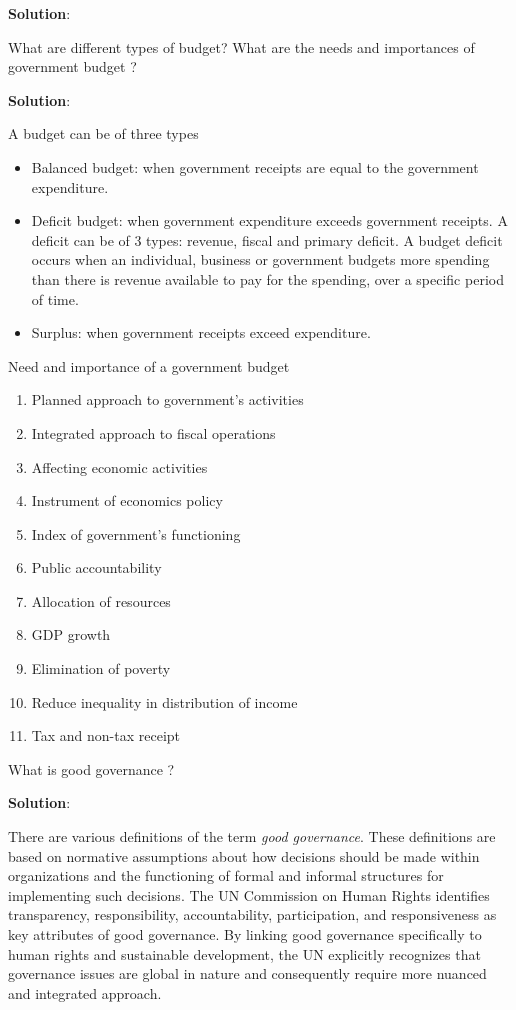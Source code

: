 \documentclass[
]{book}
\newcommand{\question}{\item}
\newenvironment{solution}{ {\bfseries Solution}:}{}
\begin{document}
\begin{questions}
\begin{solution}
\end{solution}

\question What are different types of budget? What are the needs and importances of government budget ?

\begin{solution}

A budget can be of three types
\begin{itemize}
\item Balanced budget: when government receipts are equal to the government expenditure.
\item Deficit budget: when government expenditure exceeds government receipts. A deficit can be of 3 types: revenue, fiscal and primary deficit. A budget deficit occurs when an individual, business or government budgets more spending than there is revenue available to pay for the spending, over a specific period of time.
\item Surplus: when government receipts exceed expenditure.
\end{itemize}

Need and importance of a government budget
\begin{enumerate}
\item Planned approach to government's activities
\item Integrated approach to fiscal operations
\item Affecting economic activities
\item Instrument of economics policy
\item Index of government's functioning
\item Public accountability
\item Allocation of resources
\item GDP growth
\item Elimination of poverty
\item Reduce inequality in distribution of income
\item Tax and non-tax receipt
\end{enumerate}

\end{solution}

\question What is good governance ?

\begin{solution}

There are various definitions of the term \textit{good governance}. These definitions are based on normative assumptions about how decisions should be made within organizations and the functioning of formal and informal structures for implementing such decisions. The UN Commission on Human Rights identifies transparency, responsibility, accountability, participation, and responsiveness as key attributes of good governance. By linking good governance specifically to human rights and sustainable development, the UN explicitly recognizes that governance issues are global in nature and consequently require more nuanced and integrated approach. 


\end{solution}
\end{questions}
\end{document}

